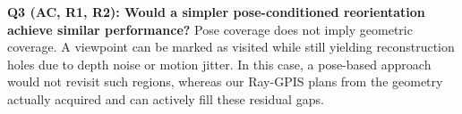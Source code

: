 \documentclass[conference]{IEEEtran}
\begin{document}


\textbf{Q3 (AC, R1, R2): Would a simpler pose-conditioned reorientation achieve similar performance?} Pose coverage does not imply geometric coverage. A viewpoint can be marked as visited while still yielding reconstruction holes due to depth noise or motion jitter. In this case, a pose-based approach would not revisit such regions, whereas our Ray-GPIS plans from the geometry actually acquired and can actively fill these residual gaps.


{

}


\end{document}
